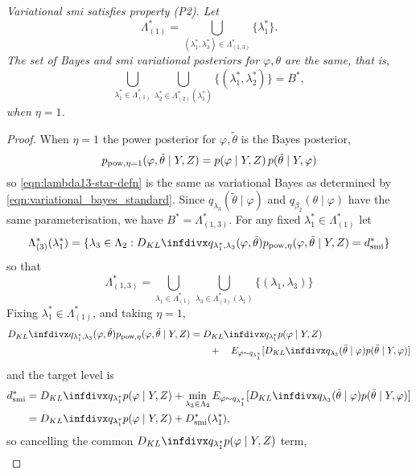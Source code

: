 {\it
  Variational \acrshort*{smi} satisfies property (P2). Let
  \[
    \Lambda^*_{(1)}=\bigcup_{(\lambda^*_1,\lambda^*_3)\in \Lambda^*_{(1,3)}} \{\lambda_1^*\}.
  \]
  The set of Bayes and \acrshort*{smi} variational posteriors for $\varphi,\theta$ are the same, that is,
  \[
    \bigcup_{\lambda_1^*\in\Lambda^*_{(1)}}\bigcup_{\lambda^*_2\in \Lambda_{(2)}^*(\lambda^*_1)} \{(\lambda^*_1,\lambda^*_2)\}=B^*,
  \]
  when $\eta=1$.
}
\begin{proof}\label{proof:smi-show-p2}
  When $\eta=1$ the power posterior for $\varphi,\tilde\theta$ is the Bayes posterior,
  \[
    p_{\operatorname{\text{pow}}, \eta=1}(\varphi,\tilde\theta \mid Y,Z)=p(\varphi \mid Y,Z)\,p(\tilde\theta \mid Y,\varphi)
  \]
  so \cref{eqn:lambda13-star-defn} is the same as variational Bayes as determined by \cref{eqn:variational_bayes_standard}. Since $q_{\lambda_3}(\tilde\theta \mid \varphi)$ and $q_{\beta_2}(\theta \mid \varphi)$ have the same parameterisation, we have $B^*=\Lambda^*_{(1,3)}$. For any fixed $\lambda^*_1\in \Lambda^*_{(1)}$ let
  \[
    \Lambda^*_{(3)}(\lambda^*_1)=\{\lambda_3\in \Lambda_2: \kl{q_{\lambda^*_1, \lambda_3}(\varphi, \tilde\theta)}{p_{\pow, \eta}(\varphi,\tilde\theta \mid Y,Z)}=d^*_{\smi}\}
  \]
  so that
  \begin{equation}
    \Lambda^*_{(1,3)}=\bigcup_{\lambda_1\in \Lambda^*_{(1)}}\bigcup_{\lambda_3\in \Lambda^*_{(3)}(\lambda_1)} \{(\lambda_1,\lambda_3)\}\label{eqn:proof-p2-lstar13}
  \end{equation}
  Fixing $\lambda^*_1\in \Lambda^*_{(1)}$, and taking $\eta=1$,
  \begin{align*}
    \kl{q_{\lambda^*_1, \lambda_3}(\varphi, \tilde\theta)}{p_{\pow, \eta}(\varphi,\tilde\theta \mid Y,Z)} & =\kl{q_{\lambda^*_1}}{p(\varphi \mid Y,Z)} \\ &\qquad +\quad E_{\varphi\sim q_{\lambda^*_1}}[\kl{q_{\lambda_3}(\tilde\theta\mid \varphi)}{p(\tilde\theta \mid Y,\varphi)}]
  \end{align*}
  and the target level is
  \begin{align*}
    d^*_{\smi} & =\kl{q_{\lambda^*_1}}{p(\varphi \mid Y,Z)}+ \min_{\lambda_3\in \Lambda_2} E_{\varphi\sim q_{\lambda^*_1}}[\kl{q_{\lambda_3}(\tilde\theta\mid \varphi)}{p(\tilde\theta \mid Y,\varphi)}] \\
               & =\kl{q_{\lambda^*_1}}{p(\varphi \mid Y,Z)}+D^*_{\smi}(\lambda^*_1),
  \end{align*}
  so cancelling the common $\kl{q_{\lambda^*_1}}{p(\varphi \mid Y,Z)}$ term,
  \begin{align}

\end{align}
\end{proof}
